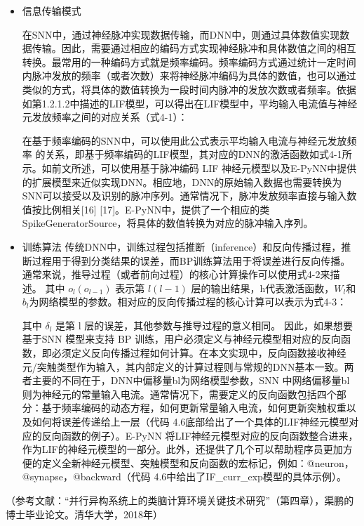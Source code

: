 \begin{itemize}
    \item 信息传输模式

    在SNN中，通过神经脉冲实现数据传输，而DNN中，则通过具体数值实现数据传输。因此，需要通过相应的编码方式实现神经脉冲和具体数值之间的相互转换。最常用的一种编码方式就是频率编码。频率编码方式通过统计一定时间内脉冲发放的频率（或者次数）来将神经脉冲编码为具体的数值，也可以通过类似的方式，将具体的数值转换为一段时间内脉冲的发放次数或者频率。依据如第1.2.1.2中描述的LIF模型，可以得出在LIF模型中，平均输入电流值与神经元发放频率之间的对应关系（式4-1）：
    
    在基于频率编码的SNN中，可以使用此公式表示平均输入电流与神经元发放频率 的关系，即基于频率编码的LIF模型，其对应的DNN的激活函数如式4-1所示。如前文所述，可以使用基于脉冲编码 LIF 神经元模型以及E-PyNN中提供的扩展模型来近似实现DNN。相应地，DNN的原始输入数据也需要转换为SNN可以接受以及识别的脉冲序列。通常情况下，脉冲发放频率直接与输入数值按比例相关[16] [17]。E-PyNN中，提供了一个相应的类SpikeGeneratorSource，将具体的数值转换为对应的脉冲输入序列。

    \item 训练算法
    传统DNN中，训练过程包括推断（inference）和反向传播过程，推断过程用于得到分类结果的误差，而BP训练算法用于将误差进行反向传播。通常来说，推导过程（或者前向过程）的核心计算操作可以使用式4-2来描述。
    其中 $o_l(o_{l−1})$ 表示第 $l(l−1)$ 层的输出结果，h代表激活函数，$W_l$和$b_l$为网络模型的参数。相对应的反向传播过程的核心计算可以表示为式4-3：

    其中 $\delta_l$ 是第 l 层的误差，其他参数与推导过程的意义相同。 因此，如果想要基于SNN 模型来支持 BP 训练，用户必须定义与神经元模型相对应的反向函数，即必须定义反向传播过程如何计算。在本文实现中，反向函数接收神经元/突触类型作为输入，其内部定义的计算过程则与常规的DNN基本一致。两者主要的不同在于，DNN中偏移量bl为网络模型参数，SNN 中网络偏移量bl则为神经元的常量输入电流。通常情况下，需要定义的反向函数包括四个部分：基于频率编码的动态方程，如何更新常量输入电流，如何更新突触权重以及如何将误差传递给上一层（代码 4.6底部给出了一个具体的LIF神经元模型对应的反向函数的例子）。E-PyNN 将LIF神经元模型对应的反向函数整合进来，作为LIF的神经元模型的一部分。此外，还提供了几个可以帮助程序员更加方便的定义全新神经元模型、突触模型和反向函数的宏标记，例如：@neuron，@synapse，@backward（代码 4.6中给出了IF\_curr\_exp模型的具体示例）。

\end{itemize}

（参考文献：“并行异构系统上的类脑计算环境关键技术研究”（第四章），渠鹏的博士毕业论文。清华大学，2018年）

